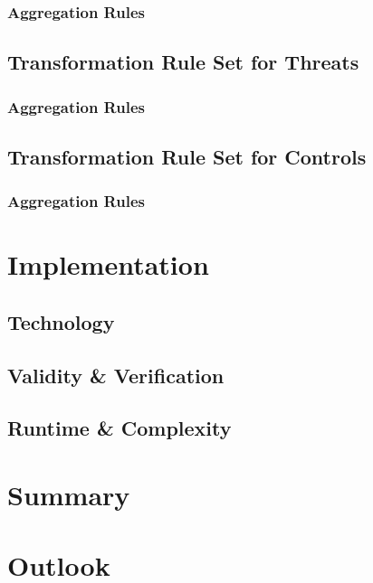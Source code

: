 \subsubsection{Aggregation Rules}
\subsection{Transformation Rule Set for Threats}
\subsubsection{Aggregation Rules}
\subsection{Transformation Rule Set for Controls}
\subsubsection{Aggregation Rules}

\section{Implementation}
\subsection{Technology}
\subsection{Validity \& Verification}
\subsection{Runtime \& Complexity}

\section{Summary}
\section{Outlook}
\label{subsec:secgoal}